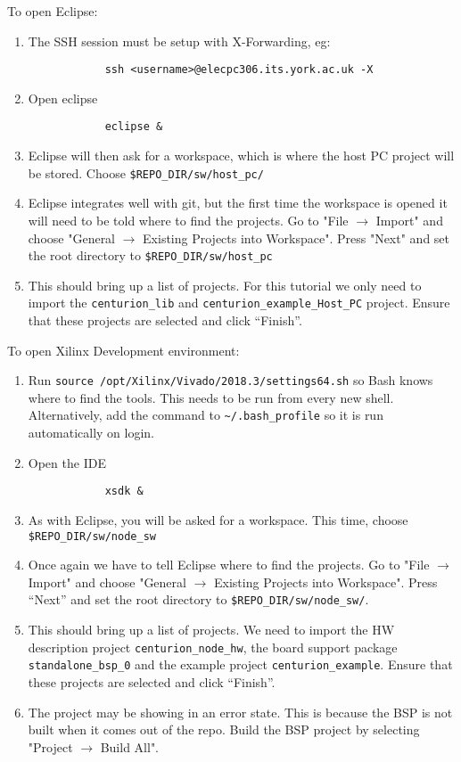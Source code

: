 \documentclass{article}
\begin{document}
	To open Eclipse:
	\begin{enumerate}
		\item The SSH session must be setup with X-Forwarding, eg:
			\begin{verbatim}
			ssh <username>@elecpc306.its.york.ac.uk -X
			\end{verbatim}
		\item Open eclipse
			\begin{verbatim}
			eclipse &
			\end{verbatim}
		\item Eclipse will then ask for a workspace, which is where the host PC project will be stored. Choose \verb|$REPO_DIR/sw/host_pc/|
		\item Eclipse integrates well with git, but the first time the workspace is opened it will need to be told where to find the projects. Go to "File $\rightarrow$ Import" and choose "General $\rightarrow$ Existing Projects into Workspace". Press "Next" and set the root directory to \verb|$REPO_DIR/sw/host_pc|
		\item This should bring up a list of projects. For this tutorial we only need to import the \verb|centurion_lib| and \verb|centurion_example_Host_PC| project. Ensure that these projects are selected and click “Finish”.
	\end{enumerate}

	To open Xilinx Development environment:
	\begin{enumerate}
		\item Run \verb|source /opt/Xilinx/Vivado/2018.3/settings64.sh| so Bash knows where to find the tools. This needs to be run from every new shell.
		Alternatively, add the command to \verb|~/.bash_profile| so it is run automatically on login.
		\item Open the IDE
			\begin{verbatim}
			xsdk &
			\end{verbatim}
		\item As with Eclipse, you will be asked for a workspace. This time, choose \verb|$REPO_DIR/sw/node_sw|
		\item Once again we have to tell Eclipse where to find the projects. Go to "File $\rightarrow$ Import" and choose "General $\rightarrow$ Existing Projects into Workspace". Press “Next” and set the root directory to \verb|$REPO_DIR/sw/node_sw/|.
		\item This should bring up a list of projects. We need to import the HW description project \verb|centurion_node_hw|, the board support package \verb|standalone_bsp_0| and the example project \verb|centurion_example|. Ensure that these projects are selected and click “Finish”.
		\item The project may be showing in an error state. This is because the BSP is not built when it comes out of the repo. Build the BSP project by selecting "Project $\rightarrow$ Build All".
	\end{enumerate}
\end{document}
